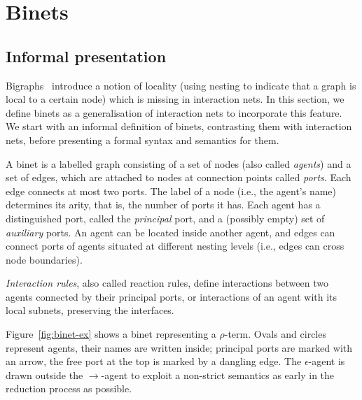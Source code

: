 \documentclass[copyright,creativecommons]{eptcs}
\begin{document}
\section{Binets}
\label{sec:binets}

\subsection{Informal presentation}

Bigraphs~\cite{jensen03bigraphs} introduce a notion of locality (using
nesting to indicate that a graph is local to a certain node) which is
missing in interaction nets. In this section, we define binets as a
generalisation of interaction nets to incorporate this feature.
We start with an informal definition of binets, contrasting them with interaction nets,
before presenting a formal syntax and semantics for them.

A binet is a labelled graph consisting of a set of nodes (also called
\emph{agents}) and a set of edges, which are attached to nodes at
connection points called \emph{ports}.  Each edge connects at most two
ports.  The label of a node (i.e., the agent's name) determines its
arity, that is, the number of ports it has. Each agent has a
distinguished port, called the \emph{principal} port, and a (possibly
empty) set of \emph{auxiliary} ports.  An agent can be located inside
another agent, and edges can connect ports of agents situated at
different nesting levels (i.e., edges can cross node boundaries).

\emph{Interaction rules}, also called reaction rules, define interactions
between two agents connected by their principal ports, or interactions of an agent with its local subnets, preserving
the interfaces.

Figure~\ref{fig:binet-ex} shows a binet representing a $\rho$-term.
Ovals and circles represent agents, their names are written inside;
principal ports are marked with an arrow, the free port at the top is
marked by a dangling edge. The $\epsilon$-agent is drawn outside the
$\rightarrow$-agent to exploit a non-strict semantics as early in the
reduction process as possible.
\end{document}
